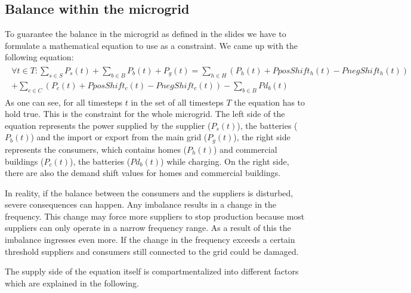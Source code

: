 \subsection{Balance within the microgrid}
To guarantee the balance in the microgrid as defined in the slides we have to formulate a mathematical equation to use as a constraint.
We came up with the following equation:\\
\begin{align} \label{eq1:balance}
\begin{split}
\forall t \in T: \sum\limits_{s \in S}{P_{s}(t)} + \sum\limits_{b \in B}{P_{b}(t)} + P_{g}(t) = \sum_{h \in H}({P_{h}(t)} + PposShift_h(t) - PnegShift_h(t))
\\ + \sum_{c \in C}({P_{c}(t)} + PposShift_c(t) - PnegShift_c(t)) - \sum\limits_{b \in B}{Pd_{b}(t)}
\end{split}
\end{align}
As one can see, for all timesteps $t$ in the set of all timesteps $T$ the equation has to hold true. 
This is the constraint for the whole microgrid. 
The left side of the equation represents the power supplied by the supplier ($P_{s}(t)$), the batteries ($P_{b}(t)$) and the import or export from the main grid ($P_{g}(t)$), the right side represents the consumers, which contains homes ($P_{h}(t)$) and commercial buildings ($P_{c}(t)$), the batteries ($Pd_{b}(t)$) while charging. 
On the right side, there are also the demand shift values for homes and commercial buildings.

In reality, if the balance between the consumers and the suppliers is disturbed, severe consequences can happen. 
Any imbalance results in a change in the frequency. 
This change may force more suppliers to stop production because most suppliers can only operate in a narrow frequency range. 
As a result of this the imbalance ingresses even more. 
If the change in the frequency exceeds a certain threshold suppliers and consumers still connected to the grid could be damaged. 

The supply side of the equation itself is compartmentalized into different factors which are explained in the following.

